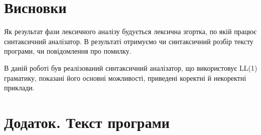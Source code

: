 \documentclass[a4paper,12pt,notitlepage,pdftex]{scrreprt}
\begin{document}
\chapter{Висновки}
\label{chap:concl}
    Як результат фази лексичного аналізу будується лексична згортка, по якій працює синтаксичний аналізатор.
    В результаті отримуємо чи синтаксичний розбір тексту програми, чи повідомлення про помилку.

    В даній роботі був реалізований синтаксичний аналізатор, що використовує LL(1) граматику, показані його основні
    можливості, приведені коректні й некоректні приклади.
\chapter*{Додаток. Текст програми}
    \lstset{language=C++,basicstyle=\scriptsize}
    
    
\end{document}

